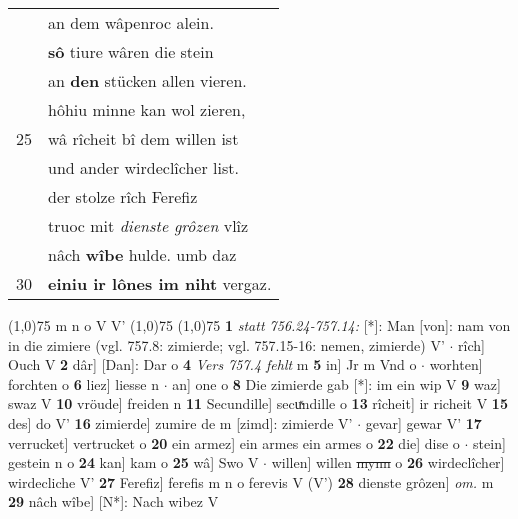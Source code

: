 \documentclass[8pt,a4paper,notitlepage]{article}
\begin{document}
\begin{table}[ht]
\begin{minipage}[t]{0.5\linewidth}
\begin{tabular}{rl}
 & an dem wâpenroc alein.\\ 
 & \textbf{sô} tiure wâren die stein\\ 
 & an \textbf{den} stücken allen vieren.\\ 
 & hôhiu minne kan wol zieren,\\ 
25 & wâ rîcheit bî dem willen ist\\ 
 & und ander wirdeclîcher list.\\ 
 & der stolze rîch Ferefiz\\ 
 & truoc mit \textit{dienste grôzen} vlîz\\ 
 & nâch \textbf{wîbe} hulde. umb daz\\ 
30 & \textbf{einiu ir lônes im niht} vergaz.\\ 
\end{tabular}
\scriptsize
\line(1,0){75} \newline
m n o V V' \newline
\line(1,0){75} \newline
\newline
\line(1,0){75} \newline
\textbf{1} \textit{statt 756.24-757.14:} [*]: Man [von]: nam von in die zimiere (vgl. 757.8: zimierde; vgl. 757.15-16: nemen, zimierde) V'   $\cdot$ rîch] Ouch V \textbf{2} dâr] [Dan]: Dar o \textbf{4} \textit{Vers 757.4 fehlt} m  \textbf{5} in] Jr m Vnd o  $\cdot$ worhten] forchten o \textbf{6} liez] liesse n  $\cdot$ an] one o \textbf{8} Die zimierde gab [*]: im ein wip V \textbf{9} waz] swaz V \textbf{10} vröude] freiden n \textbf{11} Secundille] secuͯndille o \textbf{13} rîcheit] ir richeit V \textbf{15} des] do V' \textbf{16} zimierde] zumire de m [zimd]: zimierde V'  $\cdot$ gevar] gewar V' \textbf{17} verrucket] vertrucket o \textbf{20} ein armez] ein armes ein armes o \textbf{22} die] dise o  $\cdot$ stein] gestein n o \textbf{24} kan] kam o \textbf{25} wâ] Swo V  $\cdot$ willen] willen \sout{mynn} o \textbf{26} wirdeclîcher] wirdecliche V' \textbf{27} Ferefiz] ferefis m n o ferevis V (V') \textbf{28} dienste grôzen] \textit{om.} m \textbf{29} nâch wîbe] [N*]: Nach wibez V \newline
\end{minipage}
\end{table}
\newpage
\end{document}
